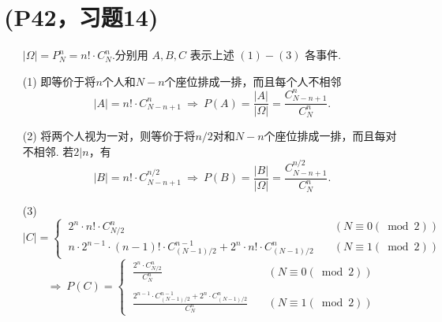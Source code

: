 \documentclass{article}
\begin{document}
\section{(P42，习题14)}
\begin{enumerate}
    \item []$|\Omega |= P_N^n = n! \cdot C_N^n $.分别用 $A, B, C$ 表示上述 $(1)-(3)$ 各事件.
    \item [(1)]即等价于将$n$个人和$N-n$个座位排成一排，而且每个人不相邻
    \[
        |A| = n! \cdot C_{N-n+1}^{n}  
        \ \Rightarrow\ 
        P(A) = 
        \displaystyle{
            \frac{|A|}{|\Omega|}
            =\frac{C_{N-n+1}^{n}}{C_{N}^{n}}
        }.
    \]
    \item [(2)]将两个人视为一对，则等价于将$n/2$对和$N-n$个座位排成一排，而且每对不相邻.
    若$2|n$，有
    \[
        |B|= n! \cdot C_{N-n+1}^{n/2}
        \ \Rightarrow\ 
        P(B) = 
        \displaystyle{
            \frac{|B|}{|\Omega|}
            =\frac{C_{N-n+1}^{n/2}}{C_{N}^{n}}
        }.
    \]
    \item [(3)]
    \[
        |C|=
        \begin{cases}
            \ 2^n \cdot n! \cdot C_{N/2}^{n}  \quad &(N\equiv 0(\bmod 2))\\
            \ n\cdot 2^{n-1}\cdot (n-1)! \cdot C_{(N-1)/2}^{n-1} + 2^{n} \cdot n! \cdot C_{(N-1)/2}^{n} \quad &(N\equiv 1(\bmod 2))
        \end{cases}
    \]
    \[
        \Rightarrow\ 
        P(C)=
        \begin{cases}
            \ \displaystyle{\frac{2^n \cdot C_{N/2}^{n}}{C_{N}^{n}}}   \quad &(N\equiv 0(\bmod 2))\\
            \\
            \ \displaystyle{\frac{2^{n-1}\cdot C_{(N-1)/2}^{n-1} + 2^{n} \cdot C_{(N-1)/2}^{n}}{C_{N}^{n}}}  \quad &(N\equiv 1(\bmod 2))
        \end{cases}
    \]
\end{enumerate}
\end{document}

